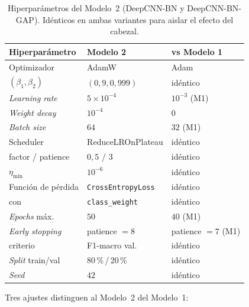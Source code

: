 \begin{table}[!t]
\centering
\caption{Hiperparámetros del Modelo~2 (DeepCNN-BN y
DeepCNN-BN-GAP). Idénticos en ambas variantes para aislar el
efecto del cabezal.}
\label{tab:hiperparam-m2}
\renewcommand{\arraystretch}{1.15}
\footnotesize
\begin{tabular}{@{}lll@{}}
\toprule
\textbf{Hiperparámetro} & \textbf{Modelo 2} & \textbf{vs Modelo 1} \\
\midrule
Optimizador               & AdamW                     & Adam                    \\
\quad $(\beta_1, \beta_2)$ & $(0{,}9, 0{,}999)$        & idéntico                \\
\textit{Learning rate}    & $5\times 10^{-4}$         & $10^{-3}$ (M1)          \\
\textit{Weight decay}     & $10^{-4}$                 & $0$                     \\
\textit{Batch size}       & $64$                      & $32$ (M1)               \\
Scheduler                 & ReduceLROnPlateau         & idéntico                \\
\quad factor / patience   & $0{,}5$ / $3$             & idéntico                \\
\quad $\eta_{\min}$       & $10^{-6}$                 & idéntico                \\
Función de pérdida        & \texttt{CrossEntropyLoss} & idéntico                \\
\quad con                 & \texttt{class\_weight}    & idéntico                \\
\textit{Epochs} máx.      & $50$                      & $40$ (M1)               \\
\textit{Early stopping}   & patience $=8$             & patience $=7$ (M1)      \\
\quad criterio            & F1-macro val.             & idéntico                \\
\textit{Split} train/val  & 80\,\%\,/\,20\,\%         & idéntico                \\
\textit{Seed}             & $42$                      & idéntico                \\
\bottomrule
\end{tabular}
\end{table}

Tres ajustes distinguen al Modelo~2 del Modelo~1:

